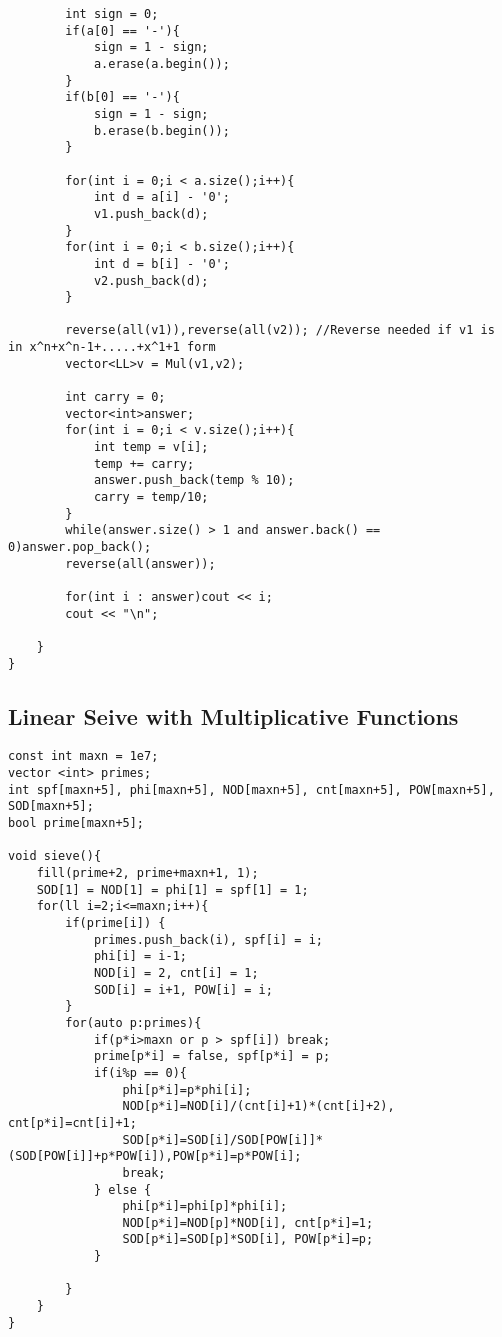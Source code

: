 \documentclass[10pt,a4paper,onesided]{article}
\begin{document}
\begin{multicols*}{3}
\begin{lstlisting}
        int sign = 0;
        if(a[0] == '-'){
            sign = 1 - sign;
            a.erase(a.begin());
        }
        if(b[0] == '-'){
            sign = 1 - sign;
            b.erase(b.begin());
        }

        for(int i = 0;i < a.size();i++){
            int d = a[i] - '0';
            v1.push_back(d);
        }
        for(int i = 0;i < b.size();i++){
            int d = b[i] - '0';
            v2.push_back(d);
        }

        reverse(all(v1)),reverse(all(v2)); //Reverse needed if v1 is in x^n+x^n-1+.....+x^1+1 form
        vector<LL>v = Mul(v1,v2);

        int carry = 0;
        vector<int>answer;
        for(int i = 0;i < v.size();i++){
            int temp = v[i];
            temp += carry;
            answer.push_back(temp % 10);
            carry = temp/10;
        }
        while(answer.size() > 1 and answer.back() == 0)answer.pop_back();
        reverse(all(answer));

        for(int i : answer)cout << i;
        cout << "\n";

    }
}
\end{lstlisting}
\subsection{Linear Seive with Multiplicative Functions}
\begin{lstlisting}
const int maxn = 1e7;
vector <int> primes;
int spf[maxn+5], phi[maxn+5], NOD[maxn+5], cnt[maxn+5], POW[maxn+5], SOD[maxn+5]; 
bool prime[maxn+5];

void sieve(){
    fill(prime+2, prime+maxn+1, 1);
    SOD[1] = NOD[1] = phi[1] = spf[1] = 1;
    for(ll i=2;i<=maxn;i++){
        if(prime[i]) {
            primes.push_back(i), spf[i] = i;
            phi[i] = i-1;
            NOD[i] = 2, cnt[i] = 1;
            SOD[i] = i+1, POW[i] = i;
        }
        for(auto p:primes){
            if(p*i>maxn or p > spf[i]) break;
            prime[p*i] = false, spf[p*i] = p;
            if(i%p == 0){
                phi[p*i]=p*phi[i];
                NOD[p*i]=NOD[i]/(cnt[i]+1)*(cnt[i]+2), cnt[p*i]=cnt[i]+1;
                SOD[p*i]=SOD[i]/SOD[POW[i]]*(SOD[POW[i]]+p*POW[i]),POW[p*i]=p*POW[i];
                break;
            } else {
                phi[p*i]=phi[p]*phi[i];
                NOD[p*i]=NOD[p]*NOD[i], cnt[p*i]=1;
                SOD[p*i]=SOD[p]*SOD[i], POW[p*i]=p;
            }

        }
    }
}\end{lstlisting}

\end{multicols*}
\end{document}
